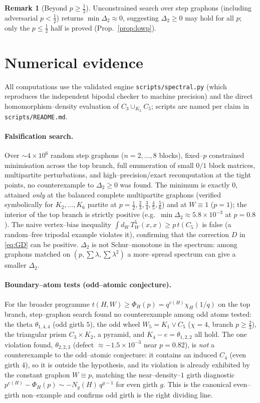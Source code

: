 \documentclass[11pt]{article}
\theoremstyle{definition}
\newtheorem{remark}[theorem]{Remark}
\newcommand{\tw}{T_W}
\begin{document}
\begin{remark}[Beyond $p\ge\tfrac12$]
Unconstrained search over step graphons (including adversarial $p<\tfrac12$)
returns $\min\Delta_2\approx0$, suggesting $\Delta_2\ge0$ may hold for all $p$;
only the $p\le\tfrac12$ half is proved (Prop.~\ref{prop:lowp}).
\end{remark}

\appendix

\section{Numerical evidence}\label{app:evidence}

All computations use the validated engine \texttt{scripts/spectral.py} (which
reproduces the independent bipodal checker to machine precision) and the direct
homomorphism--density evaluation of $C_3\cup_{K_2}C_5$; scripts are named per
claim in \texttt{scripts/README.md}.

\paragraph{Falsification search.}  Over ${\sim}4\times10^6$ random step graphons
($n=2,\dots,8$ blocks), fixed--$p$ constrained minimisation across the top branch,
full enumeration of small $0/1$ block matrices, multipartite perturbations, and
high--precision/exact recomputation at the tight points, no counterexample to
$\Delta_2\ge0$ was found.  The minimum is exactly $0$, attained \emph{only} at the
balanced complete multipartite graphons (verified symbolically for $K_2,\dots,K_6$
partite at $p=\tfrac12,\tfrac23,\tfrac34,\tfrac45,\tfrac56$) and at $W\equiv1$
($p=1$); the interior of the top branch is strictly positive (e.g.\
$\min\Delta_2\approx5.8\times10^{-3}$ at $p=0.8$).  The naive vertex--bias
inequality $\int d_W\,\tw^5(x,x)\ge p\,t(C_5)$ is false (a random--free tripodal
example violates it), confirming that the correction $D$ in \eqref{eq:GD} can be
positive.  $\Delta_2$ is not Schur--monotone in the spectrum: among graphons
matched on $(p,\sum\lambda,\sum\lambda^2)$ a more--spread spectrum can give a
smaller $\Delta_2$.

\paragraph{Boundary--atom tests (odd--atomic conjecture).}  For the broader
programme $t(H,W)\ge\Phi_H(p)=q^{v(H)}\chi_H(1/q)$ on the top branch, step--graphon
search found no counterexample among odd atoms tested: the theta $\theta_{1,4,4}$
(odd girth $5$), the odd wheel $W_5=K_1\vee C_5$ ($\chi=4$, branch $p\ge\tfrac23$),
the triangular prism $C_3\times K_2$, a pyramid, and $K_4-e=\theta_{1,2,2}$ all
hold.  The one violation found, $\theta_{2,2,3}$ (defect $\approx-1.5\times10^{-3}$
near $p=0.82$), is \emph{not} a counterexample to the odd--atomic conjecture: it
contains an induced $C_4$ (even girth $4$), so it is outside the hypothesis, and
its violation is already exhibited by the constant graphon $W\equiv p$, matching
the near--density--$1$ girth diagnostic $p^{e(H)}-\Phi_H(p)\sim-N_g(H)\,q^{g-1}$ for
even girth $g$.  This is the canonical even--girth non--example and confirms
odd girth is the right dividing line.
\end{document}
